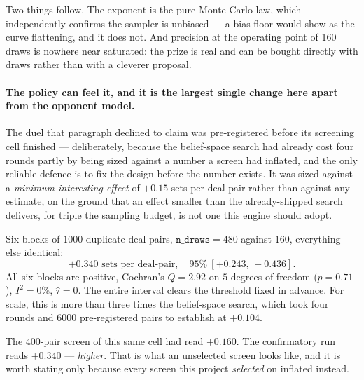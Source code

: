 \documentclass[11pt,letterpaper]{article}
\begin{document}
Two things follow. The exponent is the pure Monte Carlo law, which independently
confirms the sampler is unbiased --- a bias floor would show as the curve
flattening, and it does not. And precision at the operating point of 160 draws is
nowhere near saturated: the prize is real and can be bought directly with draws
rather than with a cleverer proposal.

\paragraph{The policy can feel it, and it is the largest single change here apart from the opponent model.}
\label{sec:res-precision}
The duel that paragraph declined to claim was pre-registered before its
screening cell finished --- deliberately, because the belief-space search had
already cost four rounds partly by being sized against a number a screen had
inflated, and the only reliable defence is to fix the design before the number
exists. It was sized against a \emph{minimum interesting effect} of $+0.15$ sets
per deal-pair rather than against any estimate, on the ground that an effect
smaller than the already-shipped search delivers, for triple the sampling
budget, is not one this engine should adopt.

Six blocks of $1000$ duplicate deal-pairs, $\texttt{n\_draws} = 480$ against
$160$, everything else identical:
\[
  +0.340 \text{ sets per deal-pair}, \quad 95\%\ [+0.243,\, +0.436].
\]
All six blocks are positive, Cochran's $Q = 2.92$ on $5$ degrees of freedom
($p = 0.71$), $I^2 = 0\%$, $\hat\tau = 0$. The entire interval clears the
threshold fixed in advance. For scale, this is more than three times the
belief-space search, which took four rounds and $6000$ pre-registered pairs to
establish at $+0.104$.

The $400$-pair screen of this same cell had read $+0.160$. The confirmatory run
reads $+0.340$ --- \emph{higher}. That is what an unselected screen looks like,
and it is worth stating only because every screen this project \emph{selected}
on inflated instead.
\end{document}
